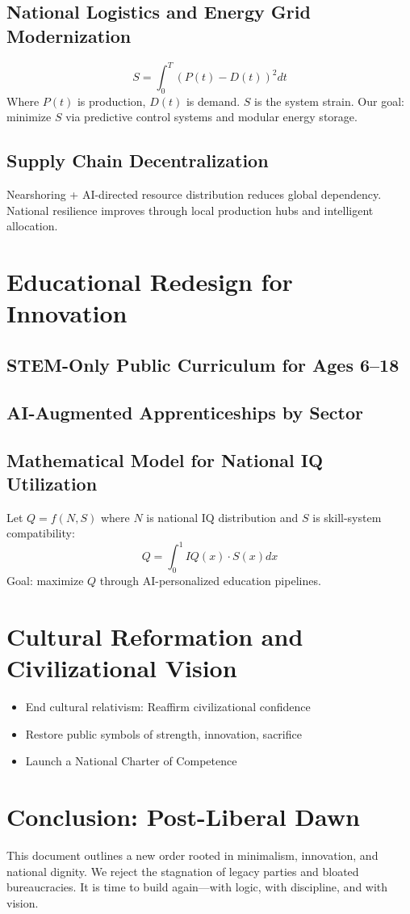 \documentclass[11pt]{article}
\begin{document}
\subsection{National Logistics and Energy Grid Modernization}
\begin{equation}
S = \int_0^T \left(P(t) - D(t)\right)^2 dt
\end{equation}
Where $P(t)$ is production, $D(t)$ is demand. $S$ is the system strain. Our goal: minimize $S$ via predictive control systems and modular energy storage.

\subsection{Supply Chain Decentralization}
Nearshoring + AI-directed resource distribution reduces global dependency. National resilience improves through local production hubs and intelligent allocation.

\section{Educational Redesign for Innovation}
\subsection{STEM-Only Public Curriculum for Ages 6–18}
\subsection{AI-Augmented Apprenticeships by Sector}
\subsection{Mathematical Model for National IQ Utilization}
Let $Q = f(N, S)$ where $N$ is national IQ distribution and $S$ is skill-system compatibility:
\begin{equation}
Q = \int_0^1 IQ(x) \cdot S(x) dx
\end{equation}
Goal: maximize $Q$ through AI-personalized education pipelines.

\section{Cultural Reformation and Civilizational Vision}
\begin{itemize}
    \item End cultural relativism: Reaffirm civilizational confidence
    \item Restore public symbols of strength, innovation, sacrifice
    \item Launch a National Charter of Competence
\end{itemize}

\section{Conclusion: Post-Liberal Dawn}
This document outlines a new order rooted in minimalism, innovation, and national dignity. We reject the stagnation of legacy parties and bloated bureaucracies. It is time to build again—with logic, with discipline, and with vision.
\end{document}

